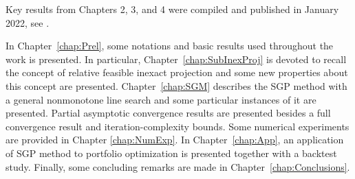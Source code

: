 Key results from Chapters 2, 3, and 4 were compiled and published in January 2022, see \cite{FerreiraLemesPrudente2022}.

In Chapter~\ref{chap:Prel}, some notations and basic results used throughout the work is presented. In particular, Chapter~\ref{chap:SubInexProj} is devoted to recall the concept of relative feasible inexact projection and some  new properties about this concept are presented. Chapter~\ref{chap:SGM}  describes the SGP method with a general nonmonotone line search and some particular instances of it are presented.  Partial asymptotic convergence results  are presented besides a full   convergence result  and iteration-complexity bounds. Some numerical experiments are provided in Chapter \ref{chap:NumExp}. In Chapter~\ref{chap:App}, an application of SGP method to portfolio optimization is presented together with a backtest study. Finally, some concluding remarks are made in Chapter~\ref{chap:Conclusions}.
